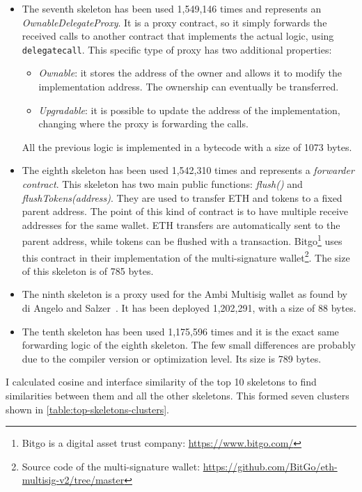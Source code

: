 \begin{itemize}
    \item The seventh skeleton has been used 1,549,146 times and represents an \textit{OwnableDelegateProxy}. It is a proxy contract, so it simply forwards the received calls to another contract that implements the actual logic, using {\tt delegatecall}. This specific type of proxy has two additional properties:
    \begin{itemize}
        \item \textit{Ownable}: it stores the address of the owner and allows it to modify the implementation address. The ownership can eventually be transferred.
        \item \textit{Upgradable}: it is possible to update the address of the implementation, changing where the proxy is forwarding the calls.
    \end{itemize}
    All the previous logic is implemented in a bytecode with a size of 1073 bytes.

    \item The eighth skeleton has been used 1,542,310 times and represents a \textit{forwarder contract}. This skeleton has two main public functions: \textit{flush()} and \textit{flushTokens(address)}. They are used to transfer ETH and tokens to a fixed parent address. The point of this kind of contract is to have multiple receive addresses for the same wallet. ETH transfers are automatically sent to the parent address, while tokens can be flushed with a transaction. Bitgo\footnote{Bitgo is a digital asset trust company: \url{https://www.bitgo.com/}} uses this contract in their implementation of the multi-signature wallet\footnote{Source code of the multi-signature wallet: \url{https://github.com/BitGo/eth-multisig-v2/tree/master}}. The size of this skeleton is of 785 bytes.

    \item The ninth skeleton is a proxy used for the Ambi Multisig wallet as found by di Angelo and Salzer~\cite{wallet-contracts}. It has been deployed 1,202,291, with a size of 88 bytes. 

    \item The tenth skeleton has been used 1,175,596 times and it is the exact same forwarding logic of the eighth skeleton. The few small differences are probably due to the compiler version or optimization level. Its size is 789 bytes.
    
\end{itemize}

I calculated cosine and interface similarity of the top 10 skeletons to find similarities between them and all the other skeletons. This formed seven clusters shown in \cref{table:top-skeletons-clusters}.

